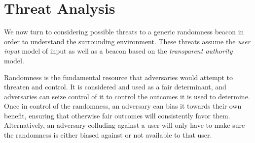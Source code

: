 \section{Threat Analysis}
We now turn to considering possible threats to a generic randomness beacon in order to understand the surrounding environment.
These threats assume the \emph{user input} model of input as well as a beacon based on the \emph{transparent authority} model.

Randomness is the fundamental resource that adversaries would attempt to threaten and control.
It is considered and used as a fair determinant, and adversaries can seize control of it to control the outcomes it is used to determine.
Once in control of the randomness, an adversary can bias it towards their own benefit, ensuring that otherwise fair outcomes will consistently favor them.
Alternatively, an adversary colluding against a user will only have to make sure the randomness is either biased against or not available to that user.

